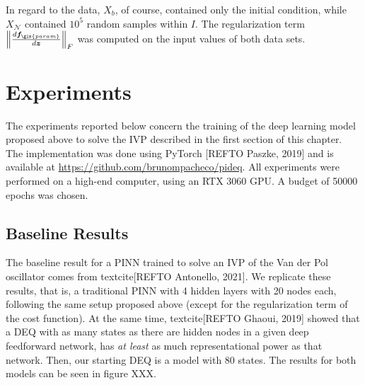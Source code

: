 In regard to the data, $X_b$, of course, contained only the initial condition, while $X_{\mathcal{N}}$ contained $10^5$ random samples within $I$.
The regularization term $\left\lVert \frac{d \bm{f}_{\gls{param}}}{d \bm{z}}\right\rVert_F$ was computed on the input values of both data sets.

\section{Experiments}

The experiments reported below concern the training of the deep learning model proposed above to solve the \gls{IVP} described in the first section of this chapter.
The implementation was done using PyTorch [REFTO Paszke, 2019] and is available at \url{https://github.com/brunompacheco/pideq}.
All experiments were performed on a high-end computer, using an RTX 3060 GPU.
A budget of 50000 epochs was chosen.

\subsection{Baseline Results}

The baseline result for a \gls{PINN} trained to solve an \gls{IVP} of the Van der Pol oscillator comes from textcite[REFTO Antonello, 2021].
We replicate these results, that is, a traditional \gls{PINN} with 4 hidden layers with 20 nodes each, following the same setup proposed above (except for the regularization term of the cost function).
At the same time, textcite[REFTO Ghaoui, 2019] showed that a \gls{DEQ} with as many states as there are hidden nodes in a given deep feedforward network, has \emph{at least} as much representational power as that network.
Then, our starting \gls{DEQ} is a model with 80 states.
The results for both models can be seen in figure XXX.

